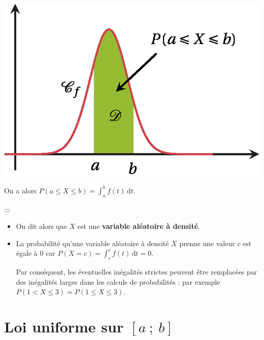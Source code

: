 \documentclass{cornouaille}
\begin{document}
\hfill

\begin{minipage}{0.3\linewidth}



\includegraphics{./TS-Variables-1}



\end{minipage}



On a alors $P(a \leqslant X \leqslant b)=\displaystyle \int_a^b f(t) \, \textrm{d}t$.


:::



\begin{remarques}

\begin{itemize}
\item On dit alors que $X$ est une \textbf{variable aléatoire à densité}.
\item La probabilité qu'une variable aléatoire à densité $X$ prenne
une valeur $c$ est égale à 0 car $P(X=c)=\displaystyle \int_c^c f(t) \, \textrm{d}t=0$.

Par conséquent, les éventuelles inégalités strictes peuvent être remplacées par des inégalités larges dans les calculs de probabilités : par exemple $P\left(1 < X \leqslant 3\right)=P\left(1 \leqslant X \leqslant 3\right)$.

\end{itemize}

\end{remarques}



\section{Loi uniforme sur $\left[a\ ;\ b \right]$}
\end{document}
